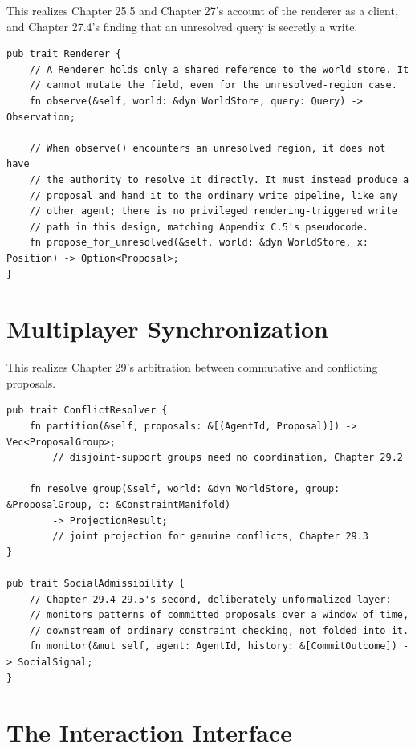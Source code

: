 This realizes Chapter 25.5 and Chapter 27's account of the renderer as a client, and Chapter 27.4's finding that an unresolved query is secretly a write.

\begin{Verbatim}[breaklines=true, breaksymbolleft={}, fontsize=\small]
pub trait Renderer {
    // A Renderer holds only a shared reference to the world store. It
    // cannot mutate the field, even for the unresolved-region case.
    fn observe(&self, world: &dyn WorldStore, query: Query) -> Observation;

    // When observe() encounters an unresolved region, it does not have
    // the authority to resolve it directly. It must instead produce a
    // proposal and hand it to the ordinary write pipeline, like any
    // other agent; there is no privileged rendering-triggered write
    // path in this design, matching Appendix C.5's pseudocode.
    fn propose_for_unresolved(&self, world: &dyn WorldStore, x: Position) -> Option<Proposal>;
}
\end{Verbatim}

\section{Multiplayer Synchronization}

This realizes Chapter 29's arbitration between commutative and conflicting proposals.

\begin{Verbatim}[breaklines=true, breaksymbolleft={}, fontsize=\small]
pub trait ConflictResolver {
    fn partition(&self, proposals: &[(AgentId, Proposal)]) -> Vec<ProposalGroup>;
        // disjoint-support groups need no coordination, Chapter 29.2

    fn resolve_group(&self, world: &dyn WorldStore, group: &ProposalGroup, c: &ConstraintManifold)
        -> ProjectionResult;
        // joint projection for genuine conflicts, Chapter 29.3
}

pub trait SocialAdmissibility {
    // Chapter 29.4-29.5's second, deliberately unformalized layer:
    // monitors patterns of committed proposals over a window of time,
    // downstream of ordinary constraint checking, not folded into it.
    fn monitor(&mut self, agent: AgentId, history: &[CommitOutcome]) -> SocialSignal;
}
\end{Verbatim}

\section{The Interaction Interface}

